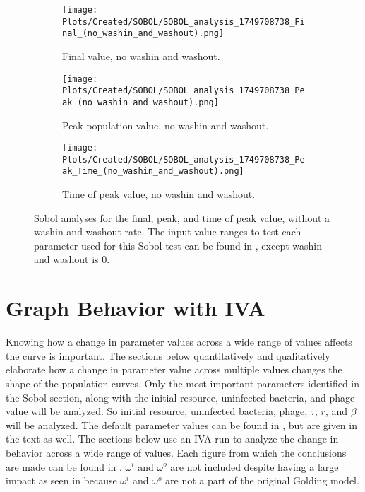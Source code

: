 \begin{figure}[ht!]
    \centering
    \begin{subfigure}{0.32\linewidth}
        \centering
        \captionsetup{width=1\linewidth}
        \texttt{[image: Plots/Created/SOBOL/SOBOL\_analysis\_1749708738\_Final\_(no\_washin\_and\_washout).png]}
        \caption{
            Final value, no washin and washout. 
        }
        \label{fig:created:Sobol_final_no_wi_wo}
    \end{subfigure}
    \hfill
    \begin{subfigure}{0.32\linewidth}
        \centering
        \captionsetup{width=1\linewidth}
        \texttt{[image: Plots/Created/SOBOL/SOBOL\_analysis\_1749708738\_Peak\_(no\_washin\_and\_washout).png]}
        \caption{
            Peak population value, no washin and washout. 
        }
        \label{fig:created:Sobol_peak_no_wi_wo}
    \end{subfigure}
    \hfill
    \begin{subfigure}{0.32\linewidth}
        \centering
        \captionsetup{width=1\linewidth}
        \texttt{[image: Plots/Created/SOBOL/SOBOL\_analysis\_1749708738\_Peak\_Time\_(no\_washin\_and\_washout).png]}
        \caption{
            Time of peak value, no washin and washout. 
        }
        \label{fig:created:Sobol_peak_time_no_wi_wo}
    \end{subfigure}
    \caption{
        Sobol analyses for the final, peak, and time of peak value, without a washin and washout rate.
        The input value ranges to test each parameter used for this Sobol test can be found in , except washin and washout is 0. 
    }
    \label{fig:created:Sobol_no_wi_wo}
\end{figure}

\section{Graph Behavior with IVA}
Knowing how a change in parameter values across a wide range of values affects the curve is important. 
The sections below quantitatively and qualitatively elaborate how a change in parameter value across multiple values changes the shape of the population curves. 
Only the most important parameters identified in the Sobol section, along with the initial resource, uninfected bacteria, and phage value will be analyzed. 
So initial resource, uninfected bacteria, phage, $\tau$, $r$, and $\beta$ will be analyzed. 
The default parameter values can be found in , but are given in the text as well. 
The sections below use an IVA run to analyze the change in behavior across a wide range of values. 
Each figure from which the conclusions are made can be found in . 
$\omega^i$ and $\omega^o$ are not included despite having a large impact as seen in  because $\omega^i$ and $\omega^o$ are not a part of the original Golding model. 


